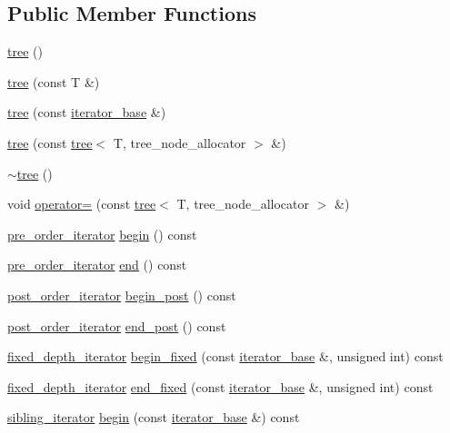 \subsection*{Public Member Functions}
\begin{CompactItemize}
\item 
\hyperlink{classtree_a064a1d9dceac9b918c5247919a4a325}{tree} ()
\item 
\hyperlink{classtree_5925c012af64fe91a3a5ed39e3ba9d9a}{tree} (const T \&)
\item 
\hyperlink{classtree_b72378e7a772a82f90d91ef7493f27bc}{tree} (const \hyperlink{classtree_1_1iterator__base}{iterator\_\-base} \&)
\item 
\hyperlink{classtree_e9e06b40929dfd33a1024bd422beedb6}{tree} (const \hyperlink{classtree}{tree}$<$ T, tree\_\-node\_\-allocator $>$ \&)
\item 
\hyperlink{classtree_f0169b515c95f4299fd2d984137b7868}{$\sim$tree} ()
\item 
void \hyperlink{classtree_9561c0c73b0605f32bf82a026eaf216a}{operator=} (const \hyperlink{classtree}{tree}$<$ T, tree\_\-node\_\-allocator $>$ \&)
\item 
\hyperlink{classtree_1_1pre__order__iterator}{pre\_\-order\_\-iterator} \hyperlink{classtree_76b3a629c0208d5ae5b4ffcd4492e05e}{begin} () const 
\item 
\hyperlink{classtree_1_1pre__order__iterator}{pre\_\-order\_\-iterator} \hyperlink{classtree_0d09fe9fd34fbfc9c9e4e28cb694448e}{end} () const 
\item 
\hyperlink{classtree_1_1post__order__iterator}{post\_\-order\_\-iterator} \hyperlink{classtree_73c673d39fe46db7ca4e1533841cdbc0}{begin\_\-post} () const 
\item 
\hyperlink{classtree_1_1post__order__iterator}{post\_\-order\_\-iterator} \hyperlink{classtree_d339ab550fc2718e84506e91960a177f}{end\_\-post} () const 
\item 
\hyperlink{classtree_1_1fixed__depth__iterator}{fixed\_\-depth\_\-iterator} \hyperlink{classtree_3e7ee34b9582cb6f0bd5b25f501a1057}{begin\_\-fixed} (const \hyperlink{classtree_1_1iterator__base}{iterator\_\-base} \&, unsigned int) const 
\item 
\hyperlink{classtree_1_1fixed__depth__iterator}{fixed\_\-depth\_\-iterator} \hyperlink{classtree_bab26c0edd25cc836ed768e32c034165}{end\_\-fixed} (const \hyperlink{classtree_1_1iterator__base}{iterator\_\-base} \&, unsigned int) const 
\item 
\hyperlink{classtree_1_1sibling__iterator}{sibling\_\-iterator} \hyperlink{classtree_a784ffa6dec85f52754dde8bd6a99aeb}{begin} (const \hyperlink{classtree_1_1iterator__base}{iterator\_\-base} \&) const 

\end{CompactItemize}
